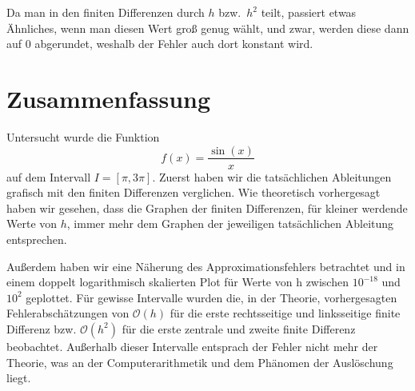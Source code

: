 \documentclass{scrartcl}
\newcommand{\BigO}{\mathcal{O}}
\theoremstyle{remark}
\begin{document}
Da man in den finiten Differenzen durch \(h\) bzw.\ \(h^2\) teilt, passiert
etwas Ähnliches, wenn man diesen Wert groß genug wählt, und zwar, werden diese
dann auf 0 abgerundet, weshalb der Fehler auch dort konstant wird.

\section{Zusammenfassung}
Untersucht wurde die Funktion
\[
    f(x) = \frac{\sin(x)}{x}
\]
auf dem Intervall \(I = [\pi, 3\pi]\). Zuerst haben wir die tatsächlichen
  Ableitungen grafisch mit den finiten Differenzen verglichen. Wie theoretisch
  vorhergesagt haben wir gesehen, dass die Graphen der finiten Differenzen, für
  kleiner werdende Werte von \(h\), immer mehr dem Graphen der jeweiligen
  tatsächlichen Ableitung entsprechen.

Außerdem haben wir eine Näherung des Approximationsfehlers betrachtet und in
einem doppelt logarithmisch skalierten Plot für Werte von h zwischen
\(10^{-18}\) und \(10^2\) geplottet. Für gewisse Intervalle wurden die, in der
Theorie, vorhergesagten Fehlerabschätzungen von \(\BigO(h)\) für die erste
rechtsseitige und linksseitige finite Differenz bzw. \(\BigO(h^2)\) für die
erste zentrale und zweite finite Differenz beobachtet. Außerhalb dieser
Intervalle entsprach der Fehler nicht mehr der Theorie, was an der
Computerarithmetik und dem Phänomen der Auslöschung liegt.

\printbibliography%
\end{document}
